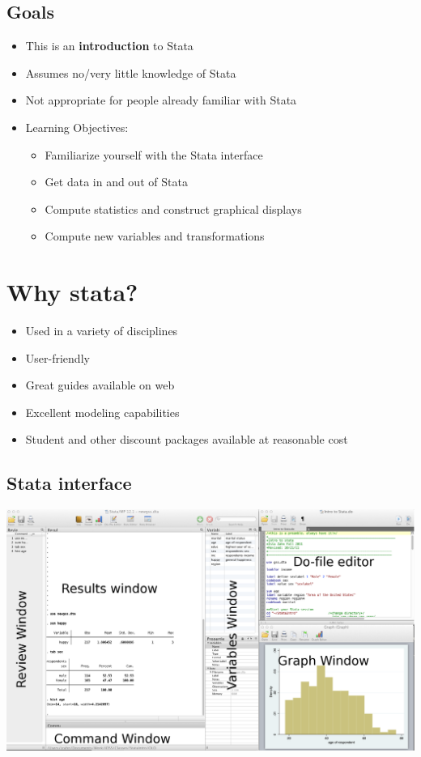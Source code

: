 \documentclass[
]{book}
\providecommand{\tightlist}{%
  \setlength{\itemsep}{0pt}\setlength{\parskip}{0pt}}
\begin{document}
\hypertarget{goals-5}{%
\subsection{Goals}\label{goals-5}}

\begin{itemize}
\tightlist
\item
  This is an \textbf{introduction} to Stata
\item
  Assumes no/very little knowledge of Stata
\item
  Not appropriate for people already familiar with Stata
\item
  Learning Objectives:

  \begin{itemize}
  \tightlist
  \item
    Familiarize yourself with the Stata interface
  \item
    Get data in and out of Stata
  \item
    Compute statistics and construct graphical displays
  \item
    Compute new variables and transformations
  \end{itemize}
\end{itemize}

\hypertarget{why-stata}{%
\section{Why stata?}\label{why-stata}}

\begin{itemize}
\tightlist
\item
  Used in a variety of disciplines
\item
  User-friendly
\item
  Great guides available on web
\item
  Excellent modeling capabilities
\item
  Student and other discount packages available at reasonable cost
\end{itemize}

\hypertarget{stata-interface}{%
\subsection{Stata interface}\label{stata-interface}}

\includegraphics{images/StataInterface.png}
\end{document}
